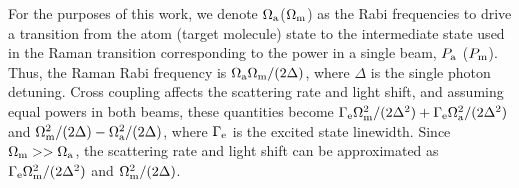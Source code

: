 \documentclass[aps,prx,secnumarabic,amsmath,amssymb,10pt,superscriptaddress]{revtex4-2}
\begin{document}
For the purposes of this work, we denote $\Omega_{\rm a} $($\Omega_{\rm m}$) as the Rabi frequencies to drive a transition from the atom (target molecule) state to the intermediate state used in the Raman transition corresponding to the power in a single beam, $P_{\rm a}$ ($P_{\rm m}$).
Thus, the Raman Rabi frequency is $\Omega_{\rm a}\Omega_{\rm m}/(2\Delta)$, where $ \Delta $ is the single photon detuning.
Cross coupling affects the scattering rate and light shift, and assuming equal powers in both beams, these quantities become $ \Gamma_{\rm e} \Omega_{\rm m}^2 / (2\Delta^2) + \Gamma_{\rm e} \Omega_{\rm a}^2 / (2\Delta^2) $ and $ \Omega_{\rm m}^2/(2\Delta) - \Omega_{\rm a}^2/(2\Delta) $, where $\Gamma_{\rm e}$ is the excited state linewidth. Since $ \Omega_{\rm m} >> \Omega_{\rm a} $, the scattering rate and light shift can be approximated as $ \Gamma_{\rm e} \Omega_{\rm m}^2/(2\Delta^2)$ and $\Omega_{\rm m}^2/(2\Delta)$.
\end{document}
